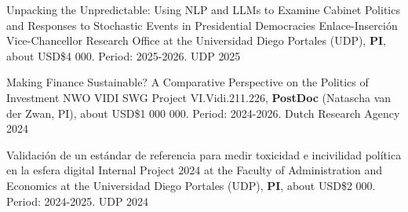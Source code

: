 





\vspace{1mm}

\begin{cvhonors}
\cvhonor
{Unpacking the Unpredictable: Using NLP and LLMs to Examine Cabinet Politics and Responses to Stochastic Events in Presidential Democracies}
{Enlace-Inserción Vice-Chancellor Research Office at the Universidad Diego Portales (UDP), {\bfseries PI}, about USD\$4 000. Period: 2025-2026.} 
{UDP}
{2025}
\end{cvhonors}

\vspace{1mm}

\begin{cvhonors}
\cvhonor
{Making Finance Sustainable? A Comparative Perspective on the Politics of Investment}
{NWO VIDI SWG Project VI.Vidi.211.226, {\bfseries PostDoc} (Natascha van der Zwan, PI), about USD\$1 000 000. Period: 2024-2026.} %
{Dutch Research Agency}
{2024}
\end{cvhonors}

\vspace{1mm}

\begin{cvhonors}
\cvhonor
{Validación de un estándar de referencia para medir toxicidad e incivilidad política en la esfera digital}
{Internal Project 2024 at the Faculty of Administration and Economics at the Universidad Diego Portales (UDP), {\bfseries PI}, about USD\$2 000. Period: 2024-2025.} %
{UDP}
{2024}
\end{cvhonors}

\vspace{1mm}

